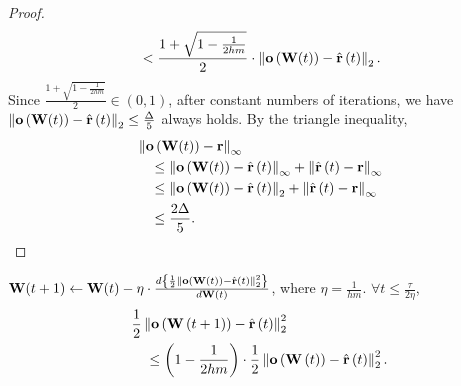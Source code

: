 \begin{proof}
\begin{equation*}
\begin{split}
    &\quad < \frac{1 + \sqrt{1 - \frac{1}{2 h m}}}{2} \cdot \left\| {\mathbf{o}}\left( {\mathbf{W}}(t) \right) - \hat{{\mathbf{r}}}\left(t\right)\right\|_2.
\end{split}
\end{equation*}
Since $\frac{1 + \sqrt{1 - \frac{1}{2 h m}}}{2} \in \left(0, 1\right)$, after constant numbers of iterations, we have $\left\| {\mathbf{o}}\left( {\mathbf{W}}(t) \right) - \hat{{\mathbf{r}}}\left(t\right)\right\|_2 \le \frac{\Delta}{5}$ always holds. By the triangle inequality,
\begin{equation*}
\begin{split}
    &\left\| {\mathbf{o}}\left( {\mathbf{W}}(t) \right) - {\mathbf{r}} \right\|_\infty \\
    &\quad \le \left\| {\mathbf{o}}\left( {\mathbf{W}}(t) \right) - \hat{{\mathbf{r}}}\left(t\right)\right\|_\infty + \left\| \hat{{\mathbf{r}}}\left(t\right) - {\mathbf{r}}\right\|_\infty \\
    &\quad \le \left\| {\mathbf{o}}\left( {\mathbf{W}}(t) \right) - \hat{{\mathbf{r}}}\left(t\right)\right\|_2 + \left\| \hat{{\mathbf{r}}}\left(t\right) - {\mathbf{r}}\right\|_\infty \\
    &\quad \le \frac{2 \Delta}{5}. \qedhere
\end{split}
\end{equation*}
\end{proof}

\begin{lem}
\label{lem:logit_l2_loss_parameter_smoothness}
${\mathbf{W}}(t+1) \leftarrow {\mathbf{W}}(t) - \eta \cdot \frac{d \left\{ \frac{1}{2} \left\| {\mathbf{o}}\left( {\mathbf{W}}\left(t\right)\right) - \hat{{\mathbf{r}}}\left(t\right) \right\|_2^2 \right\}}{d {\mathbf{W}}(t)}$, where $\eta = \frac{1}{h m}$. $\forall t \le \frac{\tau}{2 \eta}$,
\begin{equation*}
\begin{split}
    &\frac{1}{2} \left\| {\mathbf{o}}\left( {\mathbf{W}}\left(t+1\right) \right) - \hat{{\mathbf{r}}}\left(t\right) \right\|_2^2 \\
    &\quad \le \left( 1 - \frac{1}{2 h m} \right) \cdot \frac{1}{2} \left\| {\mathbf{o}}\left( {\mathbf{W}}\left(t\right) \right) - \hat{{\mathbf{r}}}\left(t\right) \right\|_2^2.
\end{split}
\end{equation*}
\end{lem}
